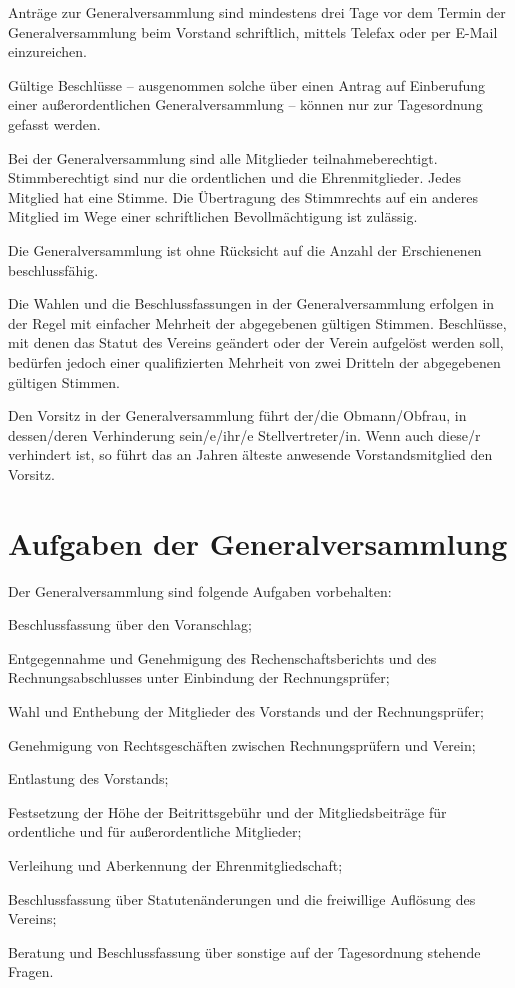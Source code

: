 \documentclass{article}
\begin{document}
\begin{absatz}
    \item Anträge zur Generalversammlung sind mindestens drei Tage vor dem Termin der Generalversammlung beim Vorstand schriftlich, mittels Telefax oder per E-Mail einzureichen.
    \item Gültige Beschlüsse – ausgenommen solche über einen Antrag auf Einberufung einer außerordentlichen Generalversammlung – können nur zur Tagesordnung gefasst werden.
    \item Bei der Generalversammlung sind alle Mitglieder teilnahmeberechtigt. Stimmberechtigt sind nur die ordentlichen und die Ehrenmitglieder. Jedes Mitglied hat eine Stimme. Die Übertragung des Stimmrechts auf ein anderes Mitglied im Wege einer schriftlichen Bevollmächtigung ist zulässig.
    \item Die Generalversammlung ist ohne Rücksicht auf die Anzahl der Erschienenen beschlussfähig.
    \item Die Wahlen und die Beschlussfassungen in der Generalversammlung erfolgen in der Regel mit einfacher Mehrheit der abgegebenen gültigen Stimmen. Beschlüsse, mit denen das Statut des Vereins geändert oder der Verein aufgelöst werden soll, bedürfen jedoch einer qualifizierten Mehrheit von zwei Dritteln der abgegebenen gültigen Stimmen.
    \item Den Vorsitz in der Generalversammlung führt der/die Obmann/Obfrau, in dessen/deren Verhinderung sein/e/ihr/e Stellvertreter/in. Wenn auch diese/r verhindert ist, so führt das an Jahren älteste anwesende Vorstandsmitglied den Vorsitz.
\end{absatz}



\section{Aufgaben der Generalversammlung}\label{generalversammlung-aufgaben}
Der Generalversammlung sind folgende Aufgaben vorbehalten:
\begin{littera}
    \item Beschlussfassung über den Voranschlag;
    \item Entgegennahme und Genehmigung des Rechenschaftsberichts und des Rechnungsabschlusses unter Einbindung der Rechnungsprüfer;
    \item Wahl und Enthebung der Mitglieder des Vorstands und der Rechnungsprüfer;
    \item Genehmigung von Rechtsgeschäften zwischen Rechnungsprüfern und Verein;
    \item Entlastung des Vorstands;
    \item Festsetzung der Höhe der Beitrittsgebühr und der Mitgliedsbeiträge für ordentliche und für außerordentliche Mitglieder;
    \item Verleihung und Aberkennung der Ehrenmitgliedschaft;
    \item Beschlussfassung über Statutenänderungen und die freiwillige Auflösung des Vereins;
    \item Beratung und Beschlussfassung über sonstige auf der Tagesordnung stehende Fragen.
\end{littera}
\end{document}
